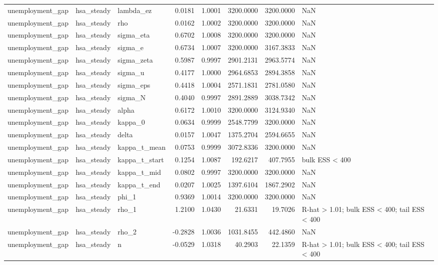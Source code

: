 \begin{tabular}{lllrrrrl}
unemployment\_gap & hsa\_steady & lambda\_ez & 0.0181 & 1.0001 & 3200.0000 & 3200.0000 & NaN \\
unemployment\_gap & hsa\_steady & rho & 0.0162 & 1.0002 & 3200.0000 & 3200.0000 & NaN \\
unemployment\_gap & hsa\_steady & sigma\_eta & 0.6702 & 1.0008 & 3200.0000 & 3200.0000 & NaN \\
unemployment\_gap & hsa\_steady & sigma\_e & 0.6734 & 1.0007 & 3200.0000 & 3167.3833 & NaN \\
unemployment\_gap & hsa\_steady & sigma\_zeta & 0.5987 & 0.9997 & 2901.2131 & 2963.5774 & NaN \\
unemployment\_gap & hsa\_steady & sigma\_u & 0.4177 & 1.0000 & 2964.6853 & 2894.3858 & NaN \\
unemployment\_gap & hsa\_steady & sigma\_eps & 0.4418 & 1.0004 & 2571.1831 & 2781.0580 & NaN \\
unemployment\_gap & hsa\_steady & sigma\_N & 0.4040 & 0.9997 & 2891.2889 & 3038.7342 & NaN \\
unemployment\_gap & hsa\_steady & alpha & 0.6172 & 1.0010 & 3200.0000 & 3124.9340 & NaN \\
unemployment\_gap & hsa\_steady & kappa\_0 & 0.0634 & 0.9999 & 2548.7799 & 3200.0000 & NaN \\
unemployment\_gap & hsa\_steady & delta & 0.0157 & 1.0047 & 1375.2704 & 2594.6655 & NaN \\
unemployment\_gap & hsa\_steady & kappa\_t\_mean & 0.0753 & 0.9999 & 3072.8336 & 3200.0000 & NaN \\
unemployment\_gap & hsa\_steady & kappa\_t\_start & 0.1254 & 1.0087 & 192.6217 & 407.7955 & bulk ESS < 400 \\
unemployment\_gap & hsa\_steady & kappa\_t\_mid & 0.0802 & 0.9997 & 3200.0000 & 3200.0000 & NaN \\
unemployment\_gap & hsa\_steady & kappa\_t\_end & 0.0207 & 1.0025 & 1397.6104 & 1867.2902 & NaN \\
unemployment\_gap & hsa\_steady & phi\_1 & 0.9369 & 1.0014 & 3200.0000 & 3200.0000 & NaN \\
unemployment\_gap & hsa\_steady & rho\_1 & 1.2100 & 1.0430 & 21.6331 & 19.7026 & R-hat > 1.01; bulk ESS < 400; tail ESS < 400 \\
unemployment\_gap & hsa\_steady & rho\_2 & -0.2828 & 1.0036 & 1031.8455 & 442.4860 & NaN \\
unemployment\_gap & hsa\_steady & n & -0.0529 & 1.0318 & 40.2903 & 22.1359 & R-hat > 1.01; bulk ESS < 400; tail ESS < 400 \\

\end{tabular}

